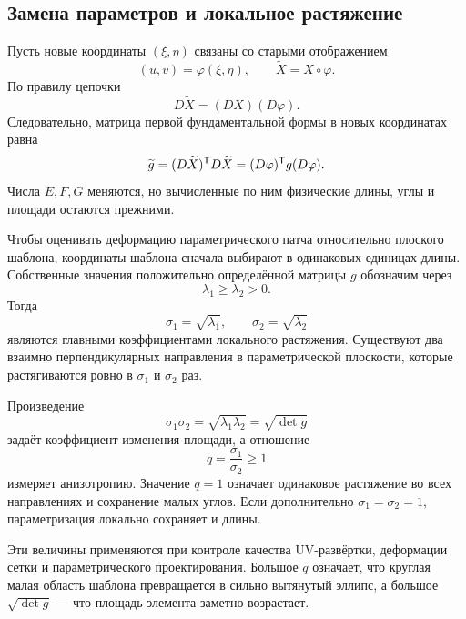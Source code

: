 \subsection{Замена параметров и локальное растяжение}

Пусть новые координаты \((\xi,\eta)\) связаны со старыми отображением
\[
(u,v)=\varphi(\xi,\eta),
\qquad
\widetilde X=X\circ\varphi.
\]
По правилу цепочки
\[
D\widetilde X=(D X)(D\varphi).
\]
Следовательно, матрица первой фундаментальной формы в новых координатах равна
\begin{equation}
\label{eq:metric-coordinate-change}
\widetilde g
=(D\widetilde X)^{\mathsf{T}}D\widetilde X
=(D\varphi)^{\mathsf{T}}g(D\varphi).
\end{equation}
Числа \(E,F,G\) меняются, но вычисленные по ним физические длины, углы и площади остаются прежними.

Чтобы оценивать деформацию параметрического патча относительно плоского шаблона, координаты шаблона сначала выбирают в одинаковых единицах длины. Собственные значения положительно определённой матрицы \(g\) обозначим через
\[
\lambda_1\geq\lambda_2>0.
\]
Тогда
\begin{equation}
\label{eq:surface-principal-stretches}
\sigma_1=\sqrt{\lambda_1},
\qquad
\sigma_2=\sqrt{\lambda_2}
\end{equation}
являются главными коэффициентами локального растяжения. Существуют два взаимно перпендикулярных направления в параметрической плоскости, которые растягиваются ровно в \(\sigma_1\) и \(\sigma_2\) раз.

Произведение
\begin{equation}
\label{eq:surface-area-stretch}
\sigma_1\sigma_2
=\sqrt{\lambda_1\lambda_2}
=\sqrt{\det g}
\end{equation}
задаёт коэффициент изменения площади, а отношение
\begin{equation}
\label{eq:surface-anisotropy}
q=\frac{\sigma_1}{\sigma_2}\geq1
\end{equation}
измеряет анизотропию. Значение \(q=1\) означает одинаковое растяжение во всех направлениях и сохранение малых углов. Если дополнительно \(\sigma_1=\sigma_2=1\), параметризация локально сохраняет и длины.

Эти величины применяются при контроле качества UV-развёртки, деформации сетки и параметрического проектирования. Большое \(q\) означает, что круглая малая область шаблона превращается в сильно вытянутый эллипс, а большое \(\sqrt{\det g}\) --- что площадь элемента заметно возрастает.

